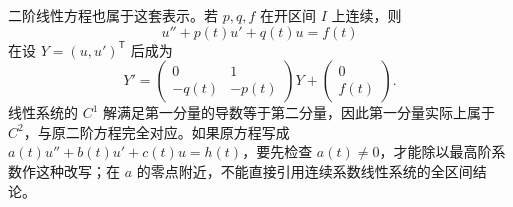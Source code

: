 \ProseParagraphBreak

二阶线性方程也属于这套表示。若 \(p,q,f\) 在开区间 \(I\) 上连续，则
\[
 u''+p(t)u'+q(t)u=f(t)
\]
在设 \(Y=(u,u')^{\mathsf T}\) 后成为
\[
 Y'=\begin{pmatrix}0&1\\-q(t)&-p(t)\end{pmatrix}Y
 +\begin{pmatrix}0\\f(t)\end{pmatrix}.
\]
线性系统的 \(C^1\) 解满足第一分量的导数等于第二分量，因此第一分量实际上属于 \(C^2\)，与原二阶方程完全对应。如果原方程写成 \(a(t)u''+b(t)u'+c(t)u=h(t)\)，要先检查 \(a(t)\ne0\)，才能除以最高阶系数作这种改写；在 \(a\) 的零点附近，不能直接引用连续系数线性系统的全区间结论。
